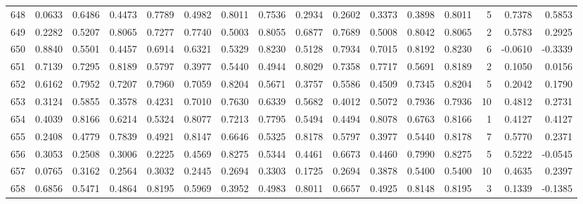 \begin{tabular}{lrrrrrrrrrrrrrrr}
648 &      0.0633 &  0.6486 &  0.4473 &  0.7789 &  0.4982 &  0.8011 &  0.7536 &  0.2934 &  0.2602 &  0.3373 &   0.3898 &     0.8011 &      5 &                    0.7378 &                     0.5853 \\
649 &      0.2282 &  0.5207 &  0.8065 &  0.7277 &  0.7740 &  0.5003 &  0.8055 &  0.6877 &  0.7689 &  0.5008 &   0.8042 &     0.8065 &      2 &                    0.5783 &                     0.2925 \\
650 &      0.8840 &  0.5501 &  0.4457 &  0.6914 &  0.6321 &  0.5329 &  0.8230 &  0.5128 &  0.7934 &  0.7015 &   0.8192 &     0.8230 &      6 &                   -0.0610 &                    -0.3339 \\
651 &      0.7139 &  0.7295 &  0.8189 &  0.5797 &  0.3977 &  0.5440 &  0.4944 &  0.8029 &  0.7358 &  0.7717 &   0.5691 &     0.8189 &      2 &                    0.1050 &                     0.0156 \\
652 &      0.6162 &  0.7952 &  0.7207 &  0.7960 &  0.7059 &  0.8204 &  0.5671 &  0.3757 &  0.5586 &  0.4509 &   0.7345 &     0.8204 &      5 &                    0.2042 &                     0.1790 \\
653 &      0.3124 &  0.5855 &  0.3578 &  0.4231 &  0.7010 &  0.7630 &  0.6339 &  0.5682 &  0.4012 &  0.5072 &   0.7936 &     0.7936 &     10 &                    0.4812 &                     0.2731 \\
654 &      0.4039 &  0.8166 &  0.6214 &  0.5324 &  0.8077 &  0.7213 &  0.7795 &  0.5494 &  0.4494 &  0.8078 &   0.6763 &     0.8166 &      1 &                    0.4127 &                     0.4127 \\
655 &      0.2408 &  0.4779 &  0.7839 &  0.4921 &  0.8147 &  0.6646 &  0.5325 &  0.8178 &  0.5797 &  0.3977 &   0.5440 &     0.8178 &      7 &                    0.5770 &                     0.2371 \\
656 &      0.3053 &  0.2508 &  0.3006 &  0.2225 &  0.4569 &  0.8275 &  0.5344 &  0.4461 &  0.6673 &  0.4460 &   0.7990 &     0.8275 &      5 &                    0.5222 &                    -0.0545 \\
657 &      0.0765 &  0.3162 &  0.2564 &  0.3032 &  0.2445 &  0.2694 &  0.3303 &  0.1725 &  0.2694 &  0.3878 &   0.5400 &     0.5400 &     10 &                    0.4635 &                     0.2397 \\
658 &      0.6856 &  0.5471 &  0.4864 &  0.8195 &  0.5969 &  0.3952 &  0.4983 &  0.8011 &  0.6657 &  0.4925 &   0.8148 &     0.8195 &      3 &                    0.1339 &                    -0.1385 \\

\end{tabular}
